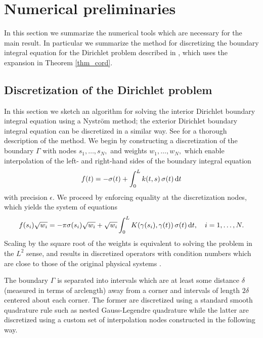 
\section{Numerical preliminaries}
In this section we summarize the numerical tools which are necessary for the main result. In particular we summarize the method for discretizing the boundary integral equation for the Dirichlet problem described in \cite{}, which uses the expansion in Theorem \ref{thm_cord}.
\subsection{Discretization of the Dirichlet problem}
In this section we sketch an algorithm for solving the interior Dirichlet boundary integral equation using a Nystr\"{o}m method; the exterior Dirichlet boundary integral equation can be discretized in a similar way. See \cite{} for a thorough description of the method. We begin by constructing a discretization of the boundary $\Gamma$ with nodes $s_1,\dots,s_N,$ and weights $w_1,\dots,w_N,$ which enable interpolation of the left- and right-hand sides of the boundary integral equation
\begin{align}
f(t) = -\sigma(t) + \int_0^L k(t,s) \,\sigma(t)\, {\rm d} t
\end{align}
with precision $\epsilon.$ We proceed by enforcing equality at the discretization nodes, which yields the system of equations
\begin{align}
f(s_i) \sqrt{w_i} = -\pi \sigma(s_i)\sqrt{w_i} +  \sqrt{w_i}\int_0^L K(\gamma(s_i),\gamma(t))\, \sigma(t)\,{\rm d}t,\quad i=1,\dots,N. \label{eqn_1std}
\end{align}
Scaling by the square root of the weights is equivalent to solving the problem in the $L^2$ sense, and results in discretized operators with condition numbers which are close to those of the original physical systems \cite{bremer3}.

The boundary $\Gamma$ is separated into intervals which are at least some distance $\delta$  (measured in terms of arclength) away from a corner and intervals of length $2 \delta$ centered about each corner. The former are discretized using a standard smooth quadrature rule such as nested Gauss-Legendre quadrature while the latter are discretized using a custom set of interpolation nodes constructed in the following way.

